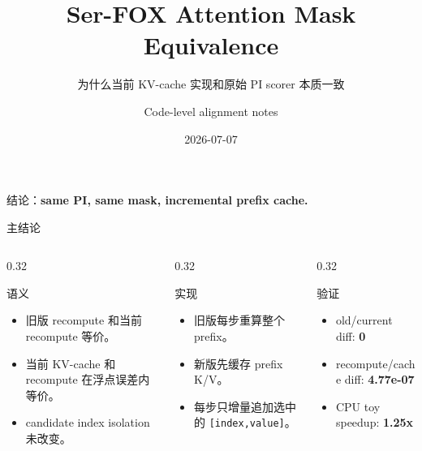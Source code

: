 \documentclass[aspectratio=169,10pt]{ctexbeamer}
\title[Ser-FOX mask equivalence]{Ser-FOX Attention Mask Equivalence}
\subtitle{为什么当前 KV-cache 实现和原始 PI scorer 本质一致}
\author{Code-level alignment notes}
\date{2026-07-07}
\begin{document}
\begin{frame}
  \titlepage
  \vspace{-0.4em}
  \begin{center}
    \small
    结论：\textbf{same PI, same mask, incremental prefix cache.}
  \end{center}
\end{frame}

\begin{frame}{主结论}
  \begin{columns}[T,onlytextwidth]
    \begin{column}{0.32\textwidth}
      \begin{block}{语义}
        \begin{itemize}
          \item 旧版 recompute 和当前 recompute 等价。
          \item 当前 KV-cache 和 recompute 在浮点误差内等价。
          \item candidate index isolation 未改变。
        \end{itemize}
      \end{block}
    \end{column}
    \begin{column}{0.32\textwidth}
      \begin{block}{实现}
        \begin{itemize}
          \item 旧版每步重算整个 prefix。
          \item 新版先缓存 prefix K/V。
          \item 每步只增量追加选中的 \texttt{[index,value]}。
        \end{itemize}
      \end{block}
    \end{column}
    \begin{column}{0.32\textwidth}
      \begin{block}{验证}
        \begin{itemize}
          \item old/current diff: \textbf{0}
          \item recompute/cache diff: \textbf{4.77e-07}
          \item CPU toy speedup: \textbf{1.25x}
        \end{itemize}
      \end{block}
    \end{column}
  \end{columns}
\end{frame}
\end{document}
